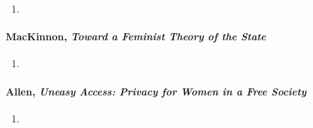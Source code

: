 \begin{enumerate}
    \item %
\end{enumerate}

\paragraph{MacKinnon, \emph{Toward a Feminist Theory of the State}}

\begin{enumerate}
    \item %
\end{enumerate}

\paragraph{Allen, \emph{Uneasy Access: Privacy for Women in a Free Society}}

\begin{enumerate}
    \item %
\end{enumerate}
